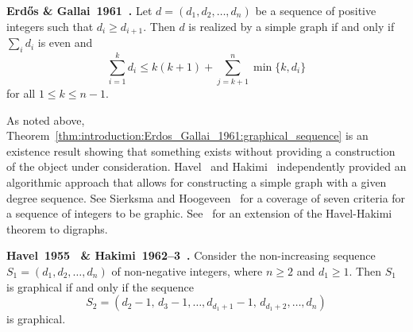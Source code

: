 \begin{theorem}
\label{thm:introduction:Erdos_Gallai_1961:graphical_sequence}
\textbf{Erd\H{o}s \& Gallai~1961~\cite{ErdosGallai1960}.}
Let $d = (d_1, d_2, \dots, d_n)$ be a sequence of positive integers
such that $d_i \geq d_{i+1}$. Then $d$ is realized by a simple graph
if and only if $\sum_i d_i$ is even and
%
\begin{equation}
\label{eq:introduction:Erdos_Gallai_1961:graphical_sequence}
\sum_{i=1}^k d_i
\leq
k(k + 1) + \sum_{j=k+1}^n \min\{k, d_i\}
\end{equation}
%
for all $1 \leq k \leq n - 1$.
\end{theorem}

As noted above,
Theorem~\ref{thm:introduction:Erdos_Gallai_1961:graphical_sequence} is
an existence result showing that something exists without providing a
construction of the object under consideration. Havel~\cite{Havel1955}
and Hakimi~\cite{Hakimi1962,Hakimi1963} independently provided an
algorithmic approach that allows for constructing a simple graph with
a given degree sequence. See Sierksma and
Hoogeveen~\cite{SierksmaHoogeveen1991} for a coverage of seven
criteria for a sequence of integers to be graphic.
See~\cite{ErdosEtAl2010} for an extension of the Havel-Hakimi theorem
to digraphs.

\begin{theorem}
\label{thm:introduction:Havel1955_Hakimi1962:graphical_sequence}
\textbf{Havel~1955~\cite{Havel1955} \&
  Hakimi~1962--3~\cite{Hakimi1962,Hakimi1963}.}
Consider the non-increasing sequence $S_1 = (d_1, d_2, \dots, d_n)$ of
non-negative integers, where $n \geq 2$ and $d_1 \geq 1$. Then $S_1$ is
graphical if and only if the sequence
\[
S_2
=
(d_2 - 1,\, d_3 - 1, \dots, d_{d_1 + 1} - 1,\, d_{d_1 + 2}, \dots, d_n)
\]
is graphical.
\end{theorem}

